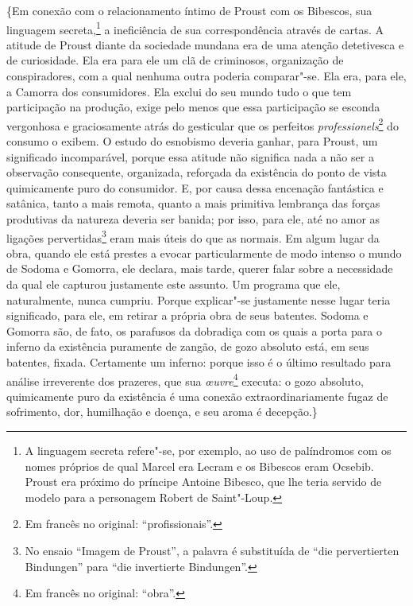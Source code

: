 \{Em conexão com o relacionamento íntimo de Proust com os Bibescos, sua
linguagem secreta,\footnote{A linguagem secreta refere"-se, por exemplo,
  ao uso de palíndromos com os nomes próprios de qual Marcel era Lecram
  e os Bibescos eram Ocsebib. Proust era próximo do príncipe Antoine
  Bibesco, que lhe teria servido de modelo para a personagem Robert de
  Saint"-Loup.} a ineficiência de sua correspondência através de cartas.
A atitude de Proust diante da sociedade mundana era de uma atenção
detetivesca e de curiosidade. Ela era para ele um clã de criminosos,
organização de conspiradores, com a qual nenhuma outra poderia
comparar"-se. Ela era, para ele, a Camorra dos consumidores. Ela exclui
do seu mundo tudo o que tem participação na produção, exige pelo menos
que essa participação se esconda vergonhosa e graciosamente atrás do
gesticular que os perfeitos \emph{professionels}\footnote{Em francês no original:
  ``profissionais''. \versal{[N. T.]}} do consumo o exibem. O estudo do esnobismo deveria
ganhar, para Proust, um significado incomparável, porque essa atitude
não significa nada a não ser a observação consequente, organizada,
reforçada da existência do ponto de vista quimicamente puro do
consumidor. E, por causa dessa encenação fantástica e satânica, tanto a
mais remota, quanto a mais primitiva lembrança das forças produtivas da
natureza deveria ser banida; por isso, para ele, até no amor as ligações
pervertidas\footnote{No ensaio ``Imagem de Proust'', a palavra
  é substituída de ``die pervertierten Bindungen'' para ``die
  invertierte Bindungen''. \versal{[N. E.]}} eram mais úteis do que as normais. Em algum
lugar da obra, quando ele está prestes a evocar particularmente de modo
intenso o mundo de Sodoma e Gomorra, ele declara, mais tarde, querer
falar sobre a necessidade da qual ele capturou justamente este assunto.
Um programa que ele, naturalmente, nunca cumpriu. Porque explicar"-se
justamente nesse lugar teria significado, para ele, em retirar a própria
obra de seus batentes. Sodoma e Gomorra são, de fato, os parafusos da
dobradiça com os quais a porta para o inferno da existência puramente de
zangão, de gozo absoluto está, em seus batentes, fixada. Certamente um
inferno: porque isso é o último resultado para análise irreverente dos
prazeres, que sua \emph{œuvre}\footnote{Em francês no original:
  ``obra''. \versal{[N. T.]}} executa: o gozo absoluto, quimicamente puro da existência é uma
conexão extraordinariamente fugaz de sofrimento, dor, humilhação e
doença, e seu aroma é decepção.\}

